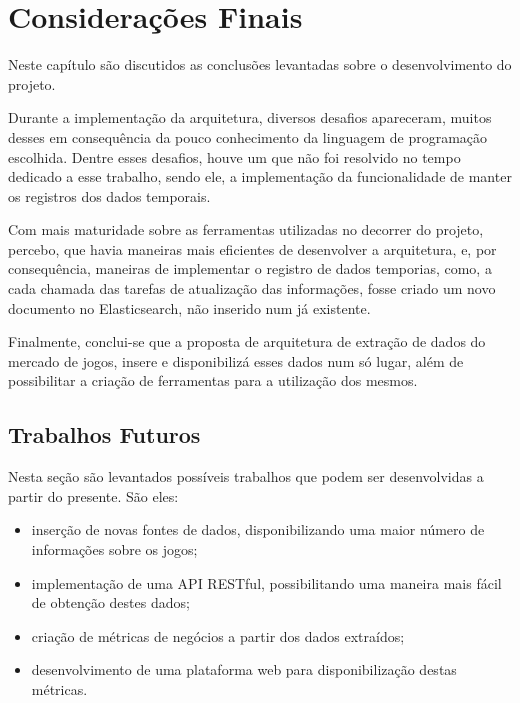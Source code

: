 \chapter[Considerações Finais]{Considerações Finais}
Neste capítulo são discutidos as conclusões levantadas sobre o desenvolvimento do projeto.

Durante a implementação da arquitetura, diversos desafios apareceram, muitos desses em consequência da pouco conhecimento da linguagem de programação escolhida. Dentre esses desafios, houve um que não foi resolvido no tempo dedicado a esse trabalho, sendo ele, a implementação da funcionalidade de manter os registros dos dados temporais.

Com mais maturidade sobre as ferramentas utilizadas no decorrer do projeto, percebo, que havia maneiras mais eficientes de desenvolver a arquitetura, e, por consequência, maneiras de implementar o registro de dados temporias, como, a cada chamada das tarefas de atualização das informações, fosse criado um novo documento no Elasticsearch, não inserido num já existente.

Finalmente, conclui-se que a proposta de arquitetura de extração de dados do mercado de jogos, insere e disponibilizá esses dados num só lugar, além de possibilitar a criação de ferramentas para a utilização dos mesmos.

\section{Trabalhos Futuros}
Nesta seção são levantados possíveis trabalhos que podem ser desenvolvidas a partir do presente. São eles:
\begin{itemize}
	\item inserção de novas fontes de dados, disponibilizando uma maior número de informações sobre os jogos;
	\item implementação de uma API RESTful, possibilitando uma maneira mais fácil de obtenção destes dados;
	\item criação de métricas de negócios a partir dos dados extraídos;
	\item desenvolvimento de uma plataforma web para disponibilização destas métricas.
\end{itemize}